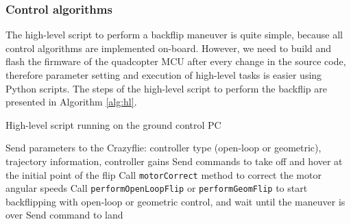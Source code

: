 \subsubsection{Control algorithms}

The high-level script to perform a backflip maneuver is quite simple, because all control algorithms are implemented on-board. However, we need to build and flash the firmware of the quadcopter MCU after every change in the source code, therefore parameter setting and execution of high-level tasks is easier using Python scripts. The steps of the high-level script to perform the backflip are presented in Algorithm \ref{alg:hl}.
\begin{algorithm}
  \caption{High-level script running on the ground control PC}
  \label{alg:hl}
  \begin{algorithmic}[1]
    \State Send parameters to the Crazyflie: controller type (open-loop or geometric), trajectory information, controller gains
    \State Send commands to take off and hover at the initial point of the flip
    \State Call \verb+motorCorrect+ method to correct the motor angular speeds
    \State Call \verb+performOpenLoopFlip+ or \verb+performGeomFlip+ to start backflipping with open-loop or geometric control, and wait until the maneuver is over
    \State Send command to land
  \end{algorithmic}
  \end{algorithm}

